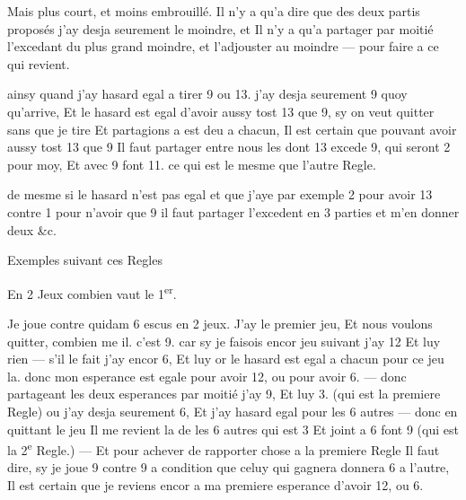 \documentclass[11pt,a4paper]{article}
\begin{document}
Mais plus court, et moins embrouillé. Il n'y a qu'a dire que des deux partis proposés
j'ay desja seurement le moindre, et Il n'y a qu'a partager par moitié l'excedant du plus grand \ill{}
moindre, et l'adjouster au moindre --- pour faire a  ce qui  revient.

ainsy quand j'ay hasard egal a tirer 9 ou 13. j'ay desja seurement 9 quoy qu'arrive, Et
le hasard est egal d'avoir aussy tost 13 que 9, sy on veut quitter sans que je tire Et partagions a\ill{}
est deu a chacun, Il est certain que pouvant avoir aussy tost 13 que 9 Il faut partager entre nous les \ill{}
dont 13 excede 9, qui seront 2 pour moy, Et avec 9 font 11. ce qui est le mesme que l'autre Regle.

de mesme si le hasard n'est pas egal et que j'aye par exemple 2 pour avoir 13 contre
1 pour n'avoir que 9 il faut partager l'excedent en 3 parties et m'en donner deux \&c.

Exemples suivant ces Regles

En 2 Jeux combien vaut le 1\textsuperscript{er}.

Je joue contre quidam 6 escus en 2 jeux. J'ay le premier jeu, Et nous voulons quitter, combien me \ill{}
il. c'est 9. car sy je faisois encor \struck{\ill{}}  jeu suivant j'ay 12 Et luy rien --- s'il le fait j'ay encor 6, Et luy \ill{}
or le hasard est egal a chacun pour ce jeu la. donc mon esperance est egale pour avoir 12, ou pour
avoir 6. --- donc partageant les deux esperances par moitié j'ay 9, Et luy 3. (qui est la premiere Regle) ou \ill{}
j'ay desja seurement 6, Et j'ay hasard egal pour les 6 autres --- donc en quittant le jeu Il me revient la \ill{}
de les 6 autres qui est 3 Et joint a 6 font 9 (qui est la 2\textsuperscript{e} Regle.) --- Et pour achever de rapporter \ill{}
chose a la premiere Regle Il faut dire, sy je joue 9 contre 9 a condition que celuy qui gagnera
donnera 6 a l'autre, Il est certain que je reviens encor a ma premiere esperance d'avoir 12, ou 6.
\end{document}
